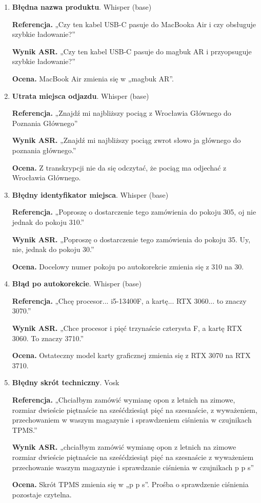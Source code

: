 \documentclass{article}
\begin{document}
\begin{enumerate}
    \item \textbf{Błędna nazwa produktu}. Whisper (base)
    \par\textbf{Referencja.} „Czy ten kabel USB-C pasuje do MacBooka Air i czy obsługuje szybkie ładowanie?”
    \par\textbf{Wynik ASR.} „Czy ten kabel USB-C pasuje do magbuk AR i przyopsuguje szybkie ładowanie?”
    \par\textbf{Ocena.} MacBook Air zmienia się w „magbuk AR”.

    \item \textbf{Utrata miejsca odjazdu}. Whisper (base)
    \par\textbf{Referencja.} „Znajdź mi najbliższy pociąg z Wrocławia Głównego do Poznania Głównego”
    \par\textbf{Wynik ASR.} „Znajdź mi najbliższy pociąg zwrot słowo ja głównego do poznania głównego.”
    \par\textbf{Ocena.} Z transkrypcji nie da się odczytać, że pociąg ma odjechać z Wrocławia Głównego.

    \item \textbf{Błędny identyfikator miejsca}. Whisper (base)
    \par\textbf{Referencja.} „Poproszę o dostarczenie tego zamówienia do pokoju 305, oj nie jednak do pokoju 310.”
    \par\textbf{Wynik ASR.} „Poproszę o dostarczenie tego zamówienia do pokoju 35. Uy, nie, jednak do pokoju 30.”
    \par\textbf{Ocena.} Docelowy numer pokoju po autokorekcie zmienia się z 310 na 30.

    \item \textbf{Błąd po autokorekcie}. Whisper (base)
    \par\textbf{Referencja.} „Chcę procesor... i5-13400F, a kartę... RTX 3060... to znaczy 3070.”
    \par\textbf{Wynik ASR.} „Chce procesor i pięć trzynaście czterysta F, a kartę RTX 3060. To znaczy 3710.”
    \par\textbf{Ocena.} Ostateczny model karty graficznej zmienia się z RTX 3070 na RTX 3710.

    \item \textbf{Błędny skrót techniczny}. Vosk
    \par\textbf{Referencja.} „Chciałbym zamówić wymianę opon z letnich na zimowe, rozmiar dwieście piętnaście na sześćdziesiąt pięć na szesnaście, z wyważeniem, przechowaniem w waszym magazynie i sprawdzeniem ciśnienia w czujnikach TPMS.”
    \par\textbf{Wynik ASR.} „chciałbym zamówić wymianę opon z letnich na zimowe rozmiar dwieście piętnaście na sześćdziesiąt pięć na szesnaście z wyważeniem przechowanie waszym magazynie i sprawdzanie ciśnienia w czujnikach p p s”
    \par\textbf{Ocena.} Skrót TPMS zmienia się w „p p s”. Prośba o sprawdzenie ciśnienia pozostaje czytelna.


\end{enumerate}
\end{document}
